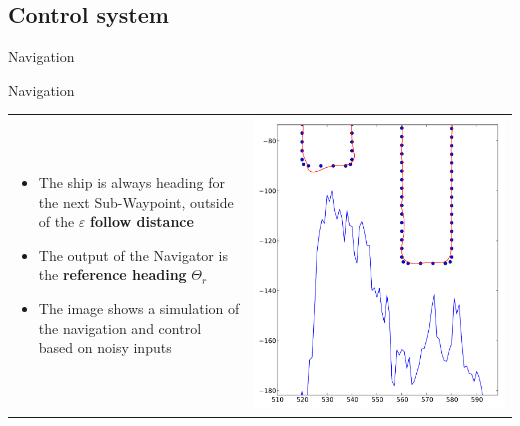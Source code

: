 \subsection{Control system}
\begin{frame}{Navigation}
    \begin{block}{Navigation}
		\begin{tabular}{l l}
		\begin{minipage}{0.45\textwidth}
		\begin{itemize}
			\item The ship is always heading for the next Sub-Waypoint, outside of the $\varepsilon$ \textbf{follow distance}
			\item The output of the Navigator is the \textbf{reference heading} $\Theta_r$
			\item The image shows a simulation of the navigation and control based on noisy inputs
		\end{itemize}
		\end{minipage}
		&
		\begin{minipage}{0.50\textwidth}
		\includegraphics[width=\textwidth,keepaspectratio]{control/img/navi}
		\end{minipage}
		\end{tabular}
    \end{block}
\end{frame}

